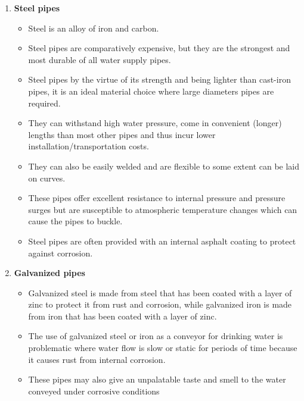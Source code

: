 \begin{itemize}
\begin{enumerate}
\item \textbf{Steel pipes}
\begin{itemize}
\item Steel is an alloy of iron and carbon.
\item Steel pipes are comparatively expensive, but they are the strongest and most durable of all water supply pipes. 
\item Steel pipes by the virtue of its strength and being lighter than cast-iron pipes, it is an ideal material choice where large diameters pipes are required.
\item They can withstand high water pressure, come in convenient (longer) lengths than most other pipes and thus incur lower installation/transportation costs.
\item They can also be easily welded and are flexible to some extent can be laid on curves.
\item These pipes offer excellent resistance to internal pressure and pressure surges but are susceptible to atmospheric temperature changes which can cause the pipes to buckle.
\item Steel pipes are often provided with an internal asphalt coating to protect against corrosion.
\end{itemize}

\item \textbf{Galvanized pipes} 
\begin{itemize}
\item Galvanized steel is made from steel that has been coated with a layer of zinc to protect it from rust and corrosion, while galvanized iron is made from iron that has been coated with a layer of zinc.  
\item The use of galvanized steel or iron as a conveyor for drinking water is problematic where water flow is slow or static for periods of time because it causes rust from internal corrosion. 
\item These pipes may also give an unpalatable taste and smell to the water conveyed under corrosive conditions
\end{itemize}


\end{enumerate}
\end{itemize}
